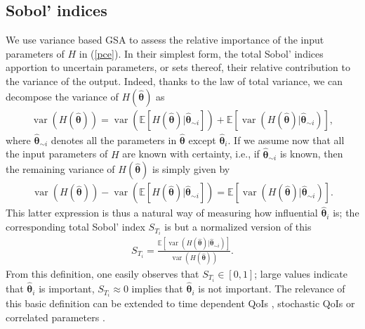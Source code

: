 \documentclass[smallextended]{svjour3}
\numberwithin{equation}{section}
\begin{document}
\subsection{Sobol' indices} 
\label{sec:gsa}
We use variance based GSA to assess the relative importance of the input parameters of $H$ in (\ref{pce}). In their simplest form, the total Sobol' indices \cite{saltellitotalindex} apportion to uncertain parameters, or sets thereof, their relative contribution to the variance of the output. Indeed, thanks to the law of total variance, we can decompose the variance of $H(\hat{\boldsymbol{\theta}})$ as
\begin{eqnarray}
\operatorname{var}(H(\hat{\boldsymbol{\theta}})) = \operatorname{var}(\mathbb E[H(\hat{\boldsymbol{\theta}})|\hat{\boldsymbol{\theta}}_{\sim i}]) + \mathbb E[\operatorname{var}(H(\hat{\boldsymbol{\theta}})|\hat{\boldsymbol{\theta}}_{\sim i})], \label{ltv}
\end{eqnarray}
where $\hat{\boldsymbol{\theta}}_{\sim i}$ denotes all the parameters in $\hat{\boldsymbol{\theta}}$ except $\hat{\boldsymbol{\theta}}_i$. If we assume now that all the input parameters of $H$ are known with certainty, i.e., if $\hat{\boldsymbol{\theta}}_{\sim i}$ is known, then the remaining variance of $H(\hat{\boldsymbol{\theta}})$ is simply given by 
\begin{eqnarray*}
\operatorname{var}(H(\hat{\boldsymbol{\theta}})) - \operatorname{var}(\mathbb E[H(\hat{\boldsymbol{\theta}})|\hat{\boldsymbol{\theta}}_{\sim i}]) = \mathbb E[\operatorname{var}(H(\hat{\boldsymbol{\theta}})|\hat{\boldsymbol{\theta}}_{\sim i})]. 
\end{eqnarray*}
This latter expression is thus a natural way of measuring how influential $\hat{\boldsymbol{\theta}}_i$ is; the corresponding total Sobol' index $S_{T_i}$ is but a normalized version of this
\begin{eqnarray}
S_{T_i} = \frac{\mathbb E[\operatorname{var}(H(\hat{\boldsymbol{\theta}})|\hat{\boldsymbol{\theta}}_{\sim i})]}{\operatorname{var}(H(\hat{\boldsymbol{\theta}})) }. \label{sobol}
\end{eqnarray}
From this definition, one easily observes that $S_{T_i} \in [0,1]$; large values indicate that $\hat{\boldsymbol{\theta}}_i$ is important, $S_{T_i} \approx 0$ implies that $\hat{\boldsymbol{\theta}}_i$ is not important.
The relevance of this basic definition can be extended to time dependent QoIs \cite{timegsa}, stochastic QoIs \cite{stogsa} or correlated parameters \cite{corvar}.
\end{document}
